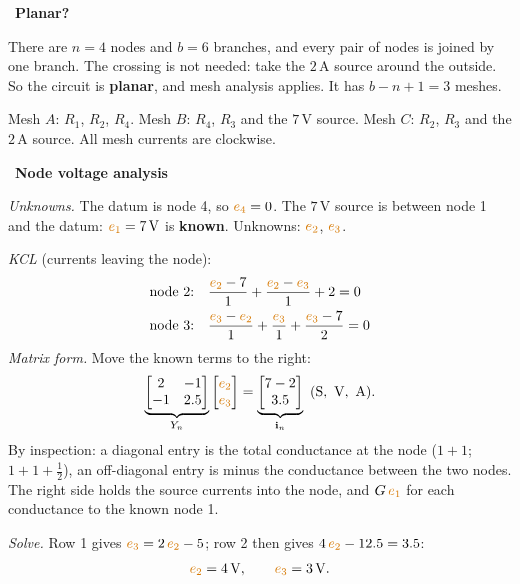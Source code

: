 \documentclass[11pt,a4paper]{article}
\newcommand{\Icol}[1]{\textcolor{ccur}{#1}}
\newcommand{\Vcol}[1]{\textcolor{cvolt}{#1}}
\newcommand{\uni}[1]{\,\mathrm{#1}}
\newcommand{\A}{\uni{A}}   \newcommand{\V}{\uni{V}}
\newif\ifsolfirst
\newcommand{\solution}{\par\smallskip\noindent{\color{cpow}\bfseries Solution}\par\nobreak\smallskip\global\solfirsttrue}
\newcommand{\solstep}[2]{\par\ifsolfirst\global\solfirstfalse\else\medskip\needspace{5\baselineskip}\fi
  \noindent{\color{cpow}\bfseries Step #1.}\ {\bfseries #2}\par\nobreak\smallskip}
\newcommand{\nodeL}[3]{\node[nlab] at (#1,#2) {#3};}
\newcommand{\qOneNodes}{%
  \foreach \p in {(0,3.6),(6,3.6),(6,0),(0,0)} \fill \p circle (1.8pt);
  \nodeL{-0.4}{3.95}{1} \nodeL{6.4}{3.95}{2} \nodeL{6.4}{-0.35}{3} \nodeL{-0.4}{-0.35}{4}}
\newcommand{\qOneCommon}{%
  \draw (0,3.6) to[american voltage source, l_=$\Vcol{7\V}$] (0,0);        %
  \draw (0,3.6) to[R, l=$R_1$] (6,3.6);
  \draw (6,3.6) to[R, l=$R_2$] (6,0);
  \draw (6,0) to[R, l=$R_3$] (0,0);
  \draw (0,3.6) -- (0.6,3.24) to[R, l_=$R_4$] (2.4,2.16) -- (6,0);}
\newcommand{\mcw}[3]{%
  \draw[-{Stealth[length=2mm]}, ccur, thick] (#1+0.42,#2) arc[start angle=0, end angle=-290, radius=0.42];
  \node[font=\small, text=ccur] at (#1,#2) {#3};}
\newcommand{\qOnePlanar}[1]{%
  \qOneCommon
  \draw (6,3.6) -- (8.4,3.6) to[american current source, l=$\Icol{2\A}$] (8.4,0) -- (8.4,-1.7)
        -- (-0.9,-1.7) -- (-0.9,0) -- (0,0);                                  %
  \qOneNodes
  \ifnum#1=1 \mcw{4.5}{2.5}{$i_A$} \mcw{1.9}{0.95}{$i_B$} \mcw{7.4}{-0.85}{$i_C$}\fi}
\begin{document}
\ifsol
{}
\solution

\solstep{a}{Planar?}
There are $n = 4$ nodes and $b = 6$ branches, and every pair of nodes is joined by one branch.
The crossing is not needed: take the $2\A$ source around the outside. So the circuit is
\textbf{planar}, and mesh analysis applies. It has $b - n + 1 = 3$ meshes.
\begin{center}
\end{center}
Mesh $A$: $R_1$, $R_2$, $R_4$. Mesh $B$: $R_4$, $R_3$ and the $7\V$ source. Mesh $C$: $R_2$, $R_3$
and the $2\A$ source. All mesh currents are clockwise.

\solstep{b}{Node voltage analysis}
\emph{Unknowns.} The datum is node 4, so $\Vcol{e_4} = 0$. The $7\V$ source is between node 1 and
the datum: $\Vcol{e_1} = 7\V$ is \textbf{known}. Unknowns: $\Vcol{e_2}$, $\Vcol{e_3}$.

\emph{KCL} (currents leaving the node):
\begin{align*}
  \text{node 2:}\quad & \frac{\Vcol{e_2} - 7}{1} + \frac{\Vcol{e_2} - \Vcol{e_3}}{1} + 2 = 0\\
  \text{node 3:}\quad & \frac{\Vcol{e_3} - \Vcol{e_2}}{1} + \frac{\Vcol{e_3}}{1}
                        + \frac{\Vcol{e_3} - 7}{2} = 0
\end{align*}
\emph{Matrix form.} Move the known terms to the right:
\[
  \underbrace{\begin{bmatrix} 2 & -1\\ -1 & 2.5 \end{bmatrix}}_{Y_n}
  \begin{bmatrix} \Vcol{e_2}\\ \Vcol{e_3} \end{bmatrix}
  = \underbrace{\begin{bmatrix} 7 - 2\\ 3.5 \end{bmatrix}}_{\mathbf{i}_n} \ \mathrm{(S,\ V,\ A)} .
\]
By inspection: a diagonal entry is the total conductance at the node ($1 + 1$; $1 + 1 + \frac12$),
an off-diagonal entry is minus the conductance between the two nodes. The right side holds the
source currents into the node, and $G\,\Vcol{e_1}$ for each conductance to the known node 1.

\emph{Solve.} Row 1 gives $\Vcol{e_3} = 2\,\Vcol{e_2} - 5$; row 2 then gives
$4\,\Vcol{e_2} - 12.5 = 3.5$:
\[
  \Vcol{e_2} = 4\V, \qquad \Vcol{e_3} = 3\V .
\]
\end{document}
